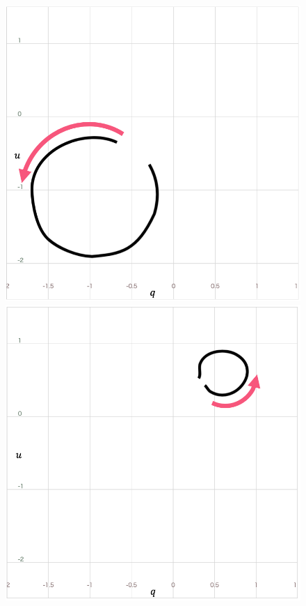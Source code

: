\begin{figure}[tb]
    \centering
    \begin{minipage}{0.49\linewidth}
        \centering
        \includegraphics[width=.9\linewidth]{figures/QBSSketchwithoutWidth.png}
    \end{minipage}
    \begin{minipage}{0.49\linewidth}
        \centering
        \includegraphics[width=.9\linewidth]{figures/QBSResultQuerywithoutWidth.png}

\end{minipage}
\end{figure}
